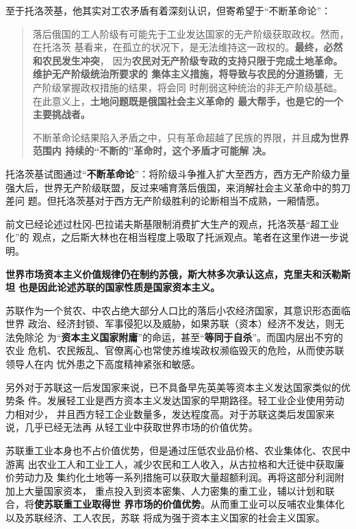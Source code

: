至于托洛茨基，他其实对工农矛盾有着深刻认识，但寄希望于“不断革命论”：
\begin{quotation}
  落后俄国的工人阶级有可能先于工业发达国家的无产阶级获取政权。然而，在托洛茨
  基看来，在孤立的状况下，是无法维持这一政权的。\textbf{最终，必然和农民发生冲突}，
  因为\textbf{农民对无产阶级专政的支持只限于完成土地革命。维护无产阶级统治所要求的
    集体主义措施，将导致与农民的分道扬镳}，无产阶级掌握政权措施的结果，将会同
  时削弱这种统治的非无产阶级基础。在此意义上，\textbf{土地问题既是俄国社会主义革命的
  最大帮手，也是它的一个主要挑战者。}

  不断革命论结果陷入矛盾之中，只有革命超越了民族的界限，并且\textbf{成为世界范围内
    持续的“不断的”革命时，这个矛盾才可能解
    决。}\cite[224-225]{mazhengshi}
\end{quotation}

托洛茨基试图通过“\textbf{不断革命论}”：将阶级斗争推入扩大至西方，西方无产阶级力量
强大后，世界无产阶级联盟，反过来哺育落后俄国，来消解社会主义革命中的剪刀差问
题。但托洛茨基对于西方无产阶级胜利的论断相当不成熟，一厢情愿。

前文已经论述过杜冈-巴拉诺夫斯基限制消费扩大生产的观点，托洛茨基“超工业化”的
观点，之后斯大林也在相当程度上吸取了托派观点。笔者在这里作进一步说明。

\textbf{世界市场资本主义价值规律仍在制约苏俄，斯大林多次承认这点，克里夫和沃勒斯坦
  也是因此论述苏联的国家性质是国家资本主义。}

苏联作为一个贫农、中农占绝大部分人口比的落后小农经济国家，其意识形态面临世界
政治、经济封锁、军事侵犯以及威胁，如果苏联（资本）经济不发达，则无法免除沦
为“\textbf{资本主义国家附庸}”的命运，甚至“\textbf{等同于自杀}”。而国内层出不穷的农业
危机、农民叛乱、官僚离心也常使苏维埃政权濒临毁灭的危险，从而使苏联领导人在内
忧外患之下高度精神紧张和敏感。

另外对于苏联这一后发国家来说，已不具备早先英美等资本主义发达国家类似的优势条
件。发展轻工业是西方资本主义发达国家的早期路径。轻工业企业使用劳动力相对少，
并且西方轻工企业数量多，发达程度高。对于苏联这类后发国家来说，几乎已经无法再
从轻工业中获取世界市场的价值优势。

苏联重工业本身也不占价值优势，但是通过压低农业品价格、农业集体化、农民中游离
出农业工人和工业工人，减少农民和工人收入，从古拉格和大迁徙中获取廉价劳动力及
集约化土地等一系列措施可以获取大量超额利润。再将这部分利润附加上大量国家资本，
重点投入到资本密集、人力密集的重工业，辅以计划和联合，将\textbf{使苏联重工业取得世
  界市场的价值优势}。从而重工业可以反哺农业集体化以及苏联经济、工人农民，苏联
将成为强于资本主义国家的社会主义国家。

